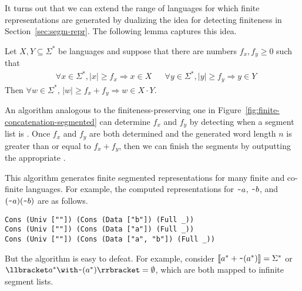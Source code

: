 It turns out that we can extend the range of languages for which
finite representations are generated by dualizing the idea for
detecting finiteness in Section~\ref{sec:segm-repr}. The following
lemma captures this idea.
\begin{lemma}
Let $X, Y \subseteq \Sigma^*$ be languages and 
suppose that there are numbers $f_x, f_y\ge0$ such that
\begin{align*}
  & \forall x \in \Sigma^*,  |x| \ge f_x \Rightarrow x \in X
  && \forall y \in \Sigma^*, |y| \ge f_y \Rightarrow y \in Y
\end{align*}
Then $\forall w \in \Sigma^*$, $|w|\ge f_x+f_y \Rightarrow w \in X\cdot Y$.
\end{lemma}
 An algorithm analogous 
to the finiteness-preserving one in
Figure~\ref{fig:finite-concatenation-segmented} can determine $f_x$
and $f_y$ by detecting when a segment list is . Once $f_x$
and $f_y$ are both determined and the generated word length $n$ is
greater than or equal to $f_x+f_y$, then we can finish the segments by
outputting the appropriate .

This algorithm generates finite segmented representations
for many finite and co-finite languages. For example, the computed
representations for $\texttt{\textasciitilde} a$, $\texttt{\textasciitilde} b$, and
${(\texttt{\textasciitilde}{a})(\texttt{\textasciitilde}{b})}$ are as follows. 
\begin{lstlisting}[numbers=none]
Cons (Univ [""]) (Cons (Data ["b"]) (Full _))
Cons (Univ [""]) (Cons (Data ["a"]) (Full _))
Cons (Univ [""]) (Cons (Data ["a", "b"]) (Full _))
\end{lstlisting}
But the algorithm is easy to defeat. For example, consider
$\llbracket a^* + \texttt{\textasciitilde}{(a^*)}\rrbracket = \Sigma^*$ or
$\Lang{\Rintersect{\Rstar a} \Rcomplement{(\Rstar a)}} = \emptyset$,
which are both mapped to infinite segment lists.

